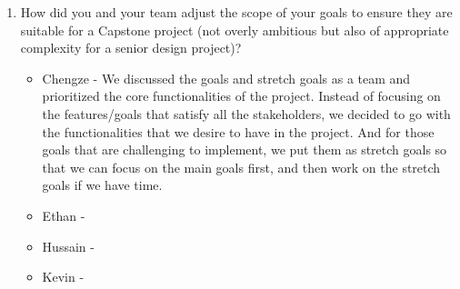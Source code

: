 \documentclass{article}
\begin{document}
\begin{enumerate}
    \item How did you and your team adjust the scope of your goals to ensure
    they are suitable for a Capstone project (not overly ambitious but also of
    appropriate complexity for a senior design project)?
    \begin{itemize}
        \item Chengze - We discussed the goals and stretch goals as a team
        and prioritized the core functionalities of the project.
        Instead of focusing on the features/goals that satisfy all 
        the stakeholders, we decided to go with the functionalities that
        we desire to have in the project. And for those goals that are 
        challenging to implement, we put them as stretch goals so that 
        we can focus on the main goals first, and then work on the 
        stretch goals if we have time.
        \item Ethan - 
        \item Hussain -
        \item Kevin -
    \end{itemize}
\end{enumerate}  
\end{document}
